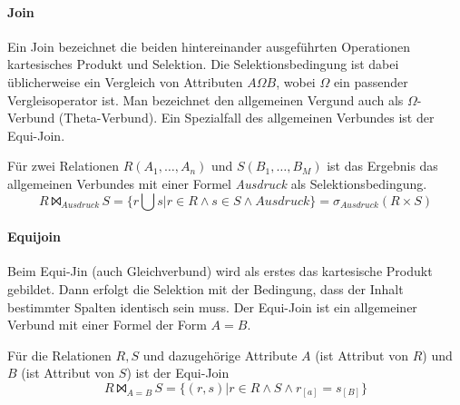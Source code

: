 \documentclass{scrbook}
\begin{document}
% 
% 



\paragraph{Join}

Ein Join bezeichnet die beiden hintereinander ausgeführten Operationen
kartesisches Produkt und Selektion.
Die Selektionsbedingung ist dabei üblicherweise ein Vergleich von Attributen
$A Ω B$, wobei $Ω$ ein passender Vergleisoperator ist.
Man bezeichnet den allgemeinen Vergund auch als $Ω$-Verbund (Theta-Verbund).
Ein Spezialfall des allgemeinen Verbundes ist der Equi-Join.

\begin{definition}
Für zwei Relationen $R(A_1, \dots, A_n)$ und $S(B_1, \dots, B_M)$ ist 
das Ergebnis das allgemeinen Verbundes mit einer Formel \emph{Ausdruck}
als Selektionsbedingung.
\begin{displaymath}
R ⨝_{Ausdruck} S = \{ r ⋃ s | r ∈ R ∧ s ∈ S ∧ Ausdruck \} = σ_{Ausdruck}(R × S)
\end{displaymath}
\end{definition}


% 
% 
% 




\paragraph{Equijoin}

Beim Equi-Jin (auch Gleichverbund) wird als erstes das kartesische Produkt gebildet.
Dann erfolgt die Selektion mit der Bedingung, dass der Inhalt bestimmter Spalten
identisch sein muss.
Der Equi-Join ist ein allgemeiner Verbund mit einer Formel der Form $A=B$.

\begin{definition}
Für die Relationen $R,S$ und dazugehörige Attribute $A$ (ist Attribut von $R$)
und $B$ (ist Attribut von $S$) ist der Equi-Join
\begin{displaymath}
R ⨝_{A=B} S = \{ (r,s) | r ∈ R ∧ S ∧ r_[a] = s_[B] \}
\end{displaymath}
\end{definition}
\end{document}
